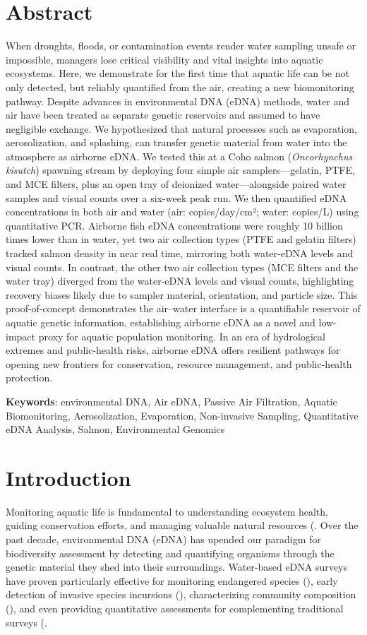 \documentclass{article}
\begin{document}
\section*{Abstract}
When droughts, floods, or contamination events render water sampling unsafe or impossible, managers lose critical visibility and vital insights into aquatic ecosystems. Here, we demonstrate for the first time that aquatic life can be not only detected, but reliably quantified from the air, creating a new biomonitoring pathway. Despite advances in environmental DNA (eDNA) methods, water and air have been treated as separate genetic reservoirs and assumed to have negligible exchange. We hypothesized that natural processes such as evaporation, aerosolization, and splashing, can transfer genetic material from water into the atmosphere as airborne eDNA. We tested this at a Coho salmon (\textit{Oncorhynchus kisutch}) spawning stream by deploying four simple air samplers—gelatin, PTFE, and MCE filters, plus an open tray of deionized water—alongside paired water samples and visual counts over a six-week peak run. We then quantified eDNA concentrations in both air and water  (air: copies/day/cm²; water: copies/L) using quantitative PCR. Airborne fish eDNA concentrations were roughly 10 billion times lower than in water, yet two air collection types (PTFE and gelatin filters) tracked salmon density in near real time, mirroring both water-eDNA levels and visual counts. In contrast, the other two air collection types (MCE filters and the water tray) diverged from the water-eDNA levels and visual counts, highlighting recovery biases likely due to sampler material, orientation, and particle size. This proof-of-concept demonstrates the air–water interface is a quantifiable reservoir of aquatic genetic information, establishing airborne eDNA as a novel and low-impact proxy for aquatic population monitoring. In an era of hydrological extremes and public-health risks, airborne eDNA offers resilient pathways for opening new frontiers for conservation, resource management, and public-health protection.

\textbf{Keywords}: environmental DNA, Air eDNA, Passive Air Filtration, Aquatic Biomonitoring, Aerosolization, Evaporation, Non-invasive Sampling, Quantitative eDNA Analysis, Salmon, Environmental Genomics

\section{Introduction}
Monitoring aquatic life is fundamental to understanding ecosystem health, guiding conservation efforts, and managing valuable natural resources (\cite{dudgeon2006,reid2019}. Over the past decade, environmental DNA (eDNA) has upended our paradigm for biodiversity assessment by detecting and quantifying organisms through the genetic material they shed into their surroundings. Water-based eDNA surveys have proven particularly effective for monitoring endangered species (\cite{biggs2015}), early detection of invasive species incursions (\cite{thomas2020}), characterizing community composition (\cite{wilkinson2024}), and even providing quantitative assessments for complementing traditional surveys (\cite{allan2023,guri2024a,tillotson2018}. 
\end{document}
